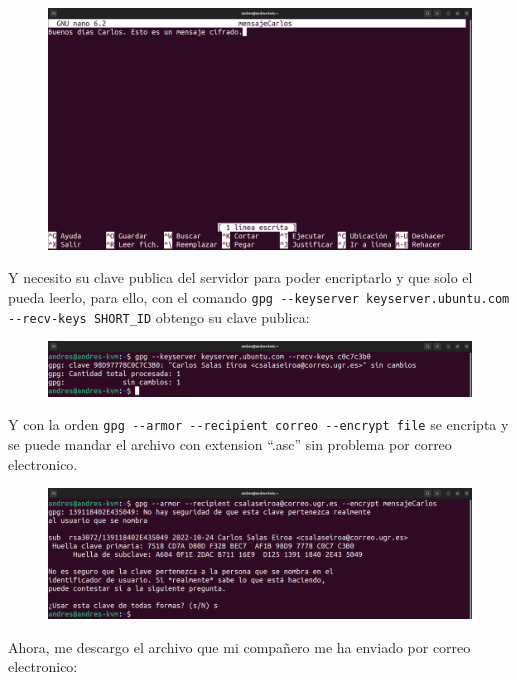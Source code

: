 \documentclass{article}
\begin{document}
\begin{figure}[H]
    \includegraphics[width=\textwidth]{imagenes/Portatil/Captura desde 2022-10-24 12-02-33.png}
\end{figure}

Y necesito su clave publica del servidor para poder encriptarlo y que solo el pueda leerlo, para ello, con el comando \verb|gpg --keyserver keyserver.ubuntu.com --recv-keys SHORT_ID| obtengo su clave publica:

\begin{figure}[H]
    \includegraphics[width=\textwidth]{imagenes/Portatil/Captura desde 2022-10-24 12-11-03.png}
\end{figure}

Y con la orden \verb|gpg --armor --recipient correo --encrypt file| se encripta y se puede mandar el archivo con extension ``.asc'' sin problema por correo electronico.

\begin{figure}[H]
    \includegraphics[width=\textwidth]{imagenes/Portatil/Captura desde 2022-10-24 12-11-31.png}
\end{figure}

Ahora, me descargo el archivo que mi compañero me ha enviado por correo electronico:
\end{document}
